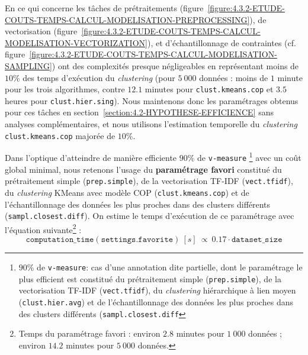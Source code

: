 			En ce qui concerne les tâches de prétraitements (figure~\ref{figure:4.3.2-ETUDE-COUTS-TEMPS-CALCUL-MODELISATION-PREPROCESSING}), de vectorisation (figure~\ref{figure:4.3.2-ETUDE-COUTS-TEMPS-CALCUL-MODELISATION-VECTORIZATION}), et d'échantillonnage de contraintes (cf. figure~\ref{figure:4.3.2-ETUDE-COUTS-TEMPS-CALCUL-MODELISATION-SAMPLING}) ont des complexités presque négligeables en représentant moins de $10$\% des temps d'exécution du \textit{clustering} (pour $5~000$ données : moins de $1$ minute pour les trois algorithmes, contre $12.1$ minutes pour \texttt{clust.kmeans.cop} et $3.5$ heures pour \texttt{clust.hier.sing}).
			Nous maintenons donc les paramétrages obtenus pour ces tâches en section~\ref{section:4.2-HYPOTHESE-EFFICIENCE} sans analyses complémentaires, et nous utilisons l'estimation temporelle du \textit{clustering} \texttt{clust.kmeans.cop} majorée de $10$\%.
			
			\begin{leftBarSummary}
				Dans l'optique d'atteindre de manière efficiente $90$\% de \texttt{v-measure}
				\footnote{$90$\% de \texttt{v-measure}: cas d'une annotation dite partielle, dont le paramétrage le plus efficient est constitué du prétraitement simple (\texttt{prep.simple}), de la vectorisation TF-IDF (\texttt{vect.tfidf}), du \textit{clustering} hiérarchique à lien moyen (\texttt{clust.hier.avg}) et de l'échantillonnage des données les plus proches dans des clusters différents (\texttt{sampl.closest.diff}}
				avec un coût global minimal, nous retenons l'usage du \textbf{paramétrage favori} constitué du prétraitement simple (\texttt{prep.simple}), de la vectorisation TF-IDF (\texttt{vect.tfidf}), du \textit{clustering} KMeans avec modèle COP (\texttt{clust.kmeans.cop}) et de l'échantillonnage des données les plus proches dans des clusters différents (\texttt{sampl.closest.diff}).
				On estime le temps d'exécution de ce paramétrage avec l'équation suivante\footnote{Temps du paramétrage favori : environ $2.8$ minutes pour $1~000$ données ; environ $14.2$ minutes pour $5~000$ données.} :
				\begin{equation}
					\label{equation:4.3.2-ETUDE-COUTS-TEMPS-CALCUL-PARAMETRAGE-FAVORI}
					\texttt{computation\_time}(\texttt{settings.favorite})~[s]~
					\propto~0.17 \cdot \texttt{dataset\_size}
				\end{equation}
			\end{leftBarSummary}
	
